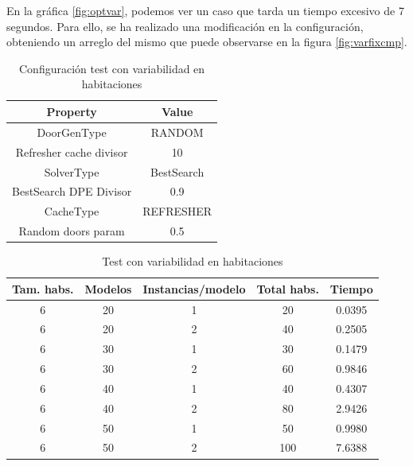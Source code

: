 En la gráfica \ref{fig:optvar}, podemos ver un caso que tarda un tiempo excesivo de 7 segundos. Para ello, se ha realizado una modificación en la configuración, obteniendo un arreglo del mismo que puede observarse en la figura \ref{fig:varfixcmp}.

\begin{table}[H]
\begin{center}
	\begin{tabular}{ | c | c | }
\hline
 		Property & Value \\ \hline
DoorGenType & RANDOM \\ 
Refresher cache divisor & 10 \\ 
SolverType & BestSearch \\ 
BestSearch DPE Divisor & 0.9 \\ 
CacheType & REFRESHER \\ 
Random doors param & 0.5 \\ 
\hline
	\end{tabular}
\end{center}
\caption{Configuración test con variabilidad en habitaciones}
\label{table:cfg-optvarsample}
\end{table}


\begin{table}[H]
\begin{center}
	\begin{tabular}{ | c | c | c | c | c | }
\hline
Tam. habs. & Modelos & Instancias/modelo & Total habs. & Tiempo \\ \hline 
6 & 20 & 1 & 20 & 0.0395 \\ 
6 & 20 & 2 & 40 & 0.2505 \\ 
6 & 30 & 1 & 30 & 0.1479 \\ 
6 & 30 & 2 & 60 & 0.9846 \\ 
6 & 40 & 1 & 40 & 0.4307 \\ 
6 & 40 & 2 & 80 & 2.9426 \\ 
6 & 50 & 1 & 50 & 0.9980 \\ 
6 & 50 & 2 & 100 & 7.6388 \\ 
\hline
	\end{tabular}
\end{center}
\caption{Test con variabilidad en habitaciones}
\label{table:optvarsample}
\end{table}



